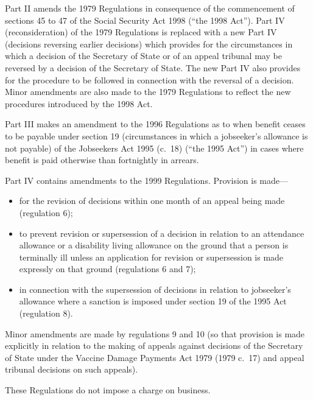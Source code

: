 \documentclass[12pt,a4paper]{article}
\begin{document}
Part II amends the 1979 Regulations in consequence of the commencement of sections 45 to 47 of the Social Security Act 1998 (“the 1998 Act”). Part IV (reconsideration) of the 1979 Regulations is replaced with a new Part IV (decisions reversing earlier decisions) which provides for the circumstances in which a decision of the Secretary of State or of an appeal tribunal may be reversed by a decision of the Secretary of State. The new Part IV also provides for the procedure to be followed in connection with the reversal of a decision. Minor amendments are also made to the 1979 Regulations to reflect the new procedures introduced by the 1998 Act.

Part III makes an amendment to the 1996 Regulations as to when benefit ceases to be payable under section 19 (circumstances in which a jobseeker’s allowance is not payable) of the Jobseekers Act 1995 (c.\ 18) (“the 1995 Act”) in cases where benefit is paid otherwise than fortnightly in arrears.

Part IV contains amendments to the 1999 Regulations. Provision is made—
\begin{itemize}
\item    for the revision of decisions within one month of an appeal being made (regulation 6);

\item    to prevent revision or supersession of a decision in relation to an attendance allowance or a disability living allowance on the ground that a person is terminally ill unless an application for revision or supersession is made expressly on that ground (regulations 6 and 7);

\item    in connection with the supersession of decisions in relation to jobseeker’s allowance where a sanction is imposed under section 19 of the 1995 Act (regulation 8). 
\end{itemize}

Minor amendments are made by regulations 9 and 10 (so that provision is made explicitly in relation to the making of appeals against decisions of the Secretary of State under the Vaccine Damage Payments Act 1979 (1979 c.\ 17) and appeal tribunal decisions on such appeals).

These Regulations do not impose a charge on business. 
\end{document}
